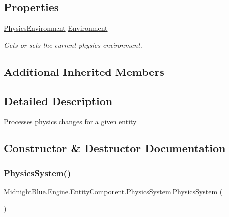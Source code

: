 \subsection*{Properties}
\begin{DoxyCompactItemize}
\item 
\hyperlink{class_midnight_blue_1_1_engine_1_1_entity_component_1_1_physics_environment}{Physics\+Environment} \hyperlink{class_midnight_blue_1_1_engine_1_1_entity_component_1_1_physics_system_a7217fe220bbdf83bae97d5c90a26b929}{Environment}
\begin{DoxyCompactList}\small\item\em Gets or sets the current physics environment. \end{DoxyCompactList}\end{DoxyCompactItemize}
\subsection*{Additional Inherited Members}


\subsection{Detailed Description}
Processes physics changes for a given entity 



\subsection{Constructor \& Destructor Documentation}
\hypertarget{class_midnight_blue_1_1_engine_1_1_entity_component_1_1_physics_system_a0e73869cd169b7c7da9874b02aa74df0}{}\label{class_midnight_blue_1_1_engine_1_1_entity_component_1_1_physics_system_a0e73869cd169b7c7da9874b02aa74df0} 
\subsubsection{\texorpdfstring{Physics\+System()}{PhysicsSystem()}}
{\footnotesize\ttfamily Midnight\+Blue.\+Engine.\+Entity\+Component.\+Physics\+System.\+Physics\+System (\begin{DoxyParamCaption}{ }\end{DoxyParamCaption})\hspace{0.3cm}{\ttfamily [inline]}}



